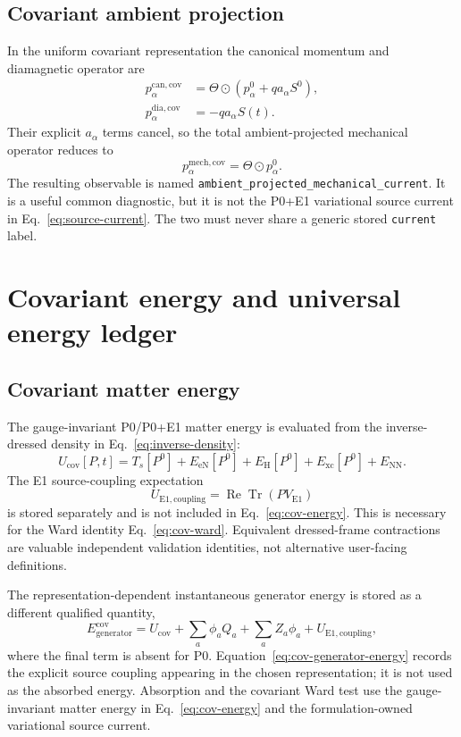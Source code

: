 \documentclass[11pt]{article}
\newcommand{\Eone}{\mathrm{E1}}
\newcommand{\ReTr}{\operatorname{Re}\operatorname{Tr}}
\newcommand{\code}[1]{\texttt{#1}}
\begin{document}
\subsection{Covariant ambient projection}

In the uniform covariant representation the canonical momentum and
diamagnetic operator are
\begin{align}
 p^{\mathrm{can,cov}}_\alpha
 &=\Theta\odot(p^0_\alpha+q a_\alpha S^0),
 \label{eq:cov-pcan}\\
 p^{\mathrm{dia,cov}}_\alpha
 &=-q a_\alpha S(t).
\end{align}
Their explicit \(a_\alpha\) terms cancel, so the total ambient-projected
mechanical operator reduces to
\begin{equation}
 p^{\mathrm{mech,cov}}_\alpha
 =\Theta\odot p^0_\alpha.
 \label{eq:cov-pmech}
\end{equation}
The resulting observable is named
\code{ambient\_projected\_mechanical\_current}. It is a useful common
diagnostic, but it is not the P0+E1 variational source current in
Eq.~\eqref{eq:source-current}. The two must never share a generic stored
\code{current} label.

\section{Covariant energy and universal energy ledger}

\subsection{Covariant matter energy}

The gauge-invariant P0/P0+E1 matter energy is evaluated from the inverse-
dressed density in Eq.~\eqref{eq:inverse-density}:
\begin{equation}
 U_{\mathrm{cov}}[P,t]
 =T_s[P^0]+E_{\mathrm{eN}}[P^0]+E_{\mathrm H}[P^0]
  +E_{\mathrm{xc}}[P^0]+E_{\mathrm{NN}}.
 \label{eq:cov-energy}
\end{equation}
The E1 source-coupling expectation
\begin{equation}
 U_{\Eone,\mathrm{coupling}}=\ReTr(PV_{\Eone})
\end{equation}
is stored separately and is not included in
Eq.~\eqref{eq:cov-energy}. This is necessary for the Ward identity
Eq.~\eqref{eq:cov-ward}. Equivalent dressed-frame contractions are valuable
independent validation identities, not alternative user-facing definitions.

The representation-dependent instantaneous generator energy is stored as a
different qualified quantity,
\begin{equation}
 E_{\mathrm{generator}}^{\mathrm{cov}}
 =U_{\mathrm{cov}}
  +\sum_a \phi_a Q_a
  +\sum_a Z_a\phi_a
  +U_{\Eone,\mathrm{coupling}},
 \label{eq:cov-generator-energy}
\end{equation}
where the final term is absent for P0.  Equation~\eqref{eq:cov-generator-energy}
records the explicit source coupling appearing in the chosen representation;
it is not used as the absorbed energy.  Absorption and the covariant Ward test
use the gauge-invariant matter energy in Eq.~\eqref{eq:cov-energy} and the
formulation-owned variational source current.
\end{document}
